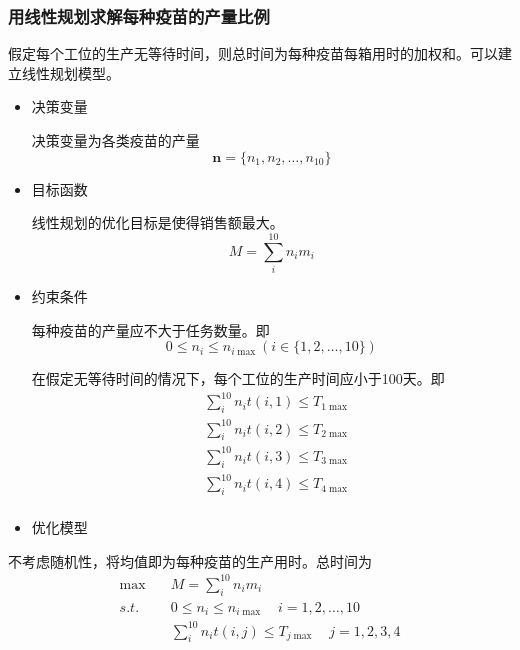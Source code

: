 \documentclass[UTF8]{ctexart}
\begin{document}
	\subsubsection{用线性规划求解每种疫苗的产量比例}
	假定每个工位的生产无等待时间，则总时间为每种疫苗每箱用时的加权和。可以建立线性规划模型。
	\begin{itemize}
	\item 决策变量
	\par 决策变量为各类疫苗的产量
	\begin{equation}
		\boldsymbol{n}=\{n_{1},n_{2},\dots,n_{10}\}
	\end{equation}
	\item 目标函数
	\par 线性规划的优化目标是使得销售额最大。
	\begin{equation}
		M=\sum_{i}^{10}n_{i}m_{i}
	\end{equation}
	\item 约束条件
	\par 每种疫苗的产量应不大于任务数量。即
	\begin{equation}
		0\leqslant n_{i}\leqslant n_{i\max}(i\in\{1,2,\dots,10\})
	\end{equation}
	\par 在假定无等待时间的情况下，每个工位的生产时间应小于100天。即
	\begin{equation}
	\begin{split}
		&\sum_{i}^{10}n_{i}t(i,1)\leqslant T_{1\max}\\
		&\sum_{i}^{10}n_{i}t(i,2)\leqslant T_{2\max}\\
		&\sum_{i}^{10}n_{i}t(i,3)\leqslant T_{3\max}\\
		&\sum_{i}^{10}n_{i}t(i,4)\leqslant T_{4\max}\\
	\end{split}
	\end{equation}
	\item 优化模型
	\end{itemize}
	不考虑随机性，将均值即为每种疫苗的生产用时。总时间为
	\begin{equation}
	\begin{split}
		\max\quad &M=\sum_{i}^{10}n_{i}m_{i}\\
		s.t.\quad&0\leqslant n_{i}\leqslant n_{i\max}\quad i=1,2,\dots,10\\
		&\sum_{i}^{10}n_{i}t(i,j)\leqslant T_{j\max} \quad j=1,2,3,4\\
	\end{split}
	\end{equation}
\end{document}
